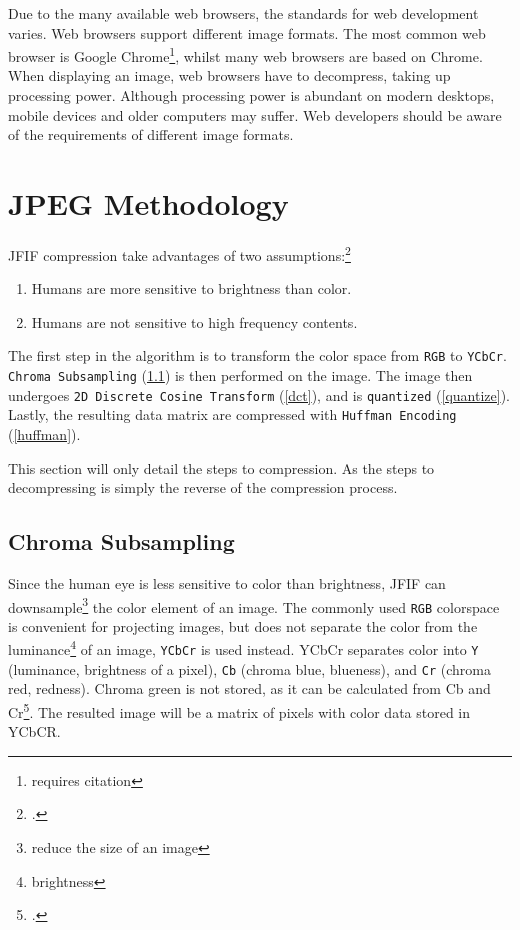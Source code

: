\documentclass{article}
\begin{document}
Due to the many available web browsers, the standards for web development varies.
Web browsers support different image formats.
The most common web browser is Google Chrome\footnote{requires citation}, whilst many web browsers are based on Chrome.
When displaying an image, web browsers have to decompress, taking up processing power.
Although processing power is abundant on modern desktops, mobile devices and older computers may suffer.
Web developers should be aware of the requirements of different image formats.

\section{JPEG Methodology}

JFIF compression take advantages of two assumptions:\footcite{jpegCornell}
\begin{enumerate}
	\item Humans are more sensitive to brightness than color.
	\item Humans are not sensitive to high frequency contents.
\end{enumerate}

The first step in the algorithm is to transform the color space from \texttt{RGB} to \texttt{YCbCr}.
\texttt{Chroma Subsampling} (\ref{chroma}) is then performed on the image.
The image then undergoes \texttt{2D Discrete Cosine Transform} (\ref{dct}), and is \texttt{quantized} (\ref{quantize}).
Lastly, the resulting data matrix are compressed with \texttt{Huffman Encoding} (\ref{huffman}).

This section will only detail the steps to compression.
As the steps to decompressing is simply the reverse of the compression process.

\subsection{Chroma Subsampling}\label{chroma}
Since the human eye is less sensitive to color than brightness, JFIF can downsample\footnote{reduce the size of an image} the color element of an image.
The commonly used \texttt{RGB} colorspace is convenient for projecting images, but does not separate the color from the luminance\footnote{brightness} of an image, \texttt{YCbCr} is used instead.
YCbCr separates color into \texttt{Y} (luminance, brightness of a pixel), \texttt{Cb} (chroma blue, blueness), and \texttt{Cr} (chroma red, redness).
Chroma green is not stored, as it can be calculated from Cb and Cr\footcite{ycbcrMedia}.
The resulted image will be a matrix of pixels with color data stored in YCbCR.
\end{document}
